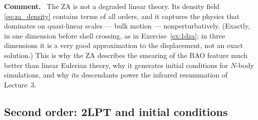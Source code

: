 \documentclass[a4paper,11pt]{article}
\numberwithin{equation}{section}
\newenvironment{remark}
  {\par\medskip\noindent\begingroup\small\color{ForestGreen!60!black}\textbf{Comment.}\ }
  {\endgroup\par\medskip}
\begin{document}
\begin{remark}
The ZA is not a degraded linear theory. Its density field \eqref{eq:za_density} contains terms of all orders, and it captures the physics that dominates on quasi-linear scales --- bulk motion --- nonperturbatively. (Exactly, in one dimension before shell crossing, as in Exercise~\ref{ex:1dza}; in three dimensions it is a very good approximation to the displacement, not an exact solution.) This is why the ZA describes the smearing of the BAO feature much better than linear Eulerian theory, why it generates initial conditions for $N$-body simulations, and why its descendants power the infrared resummation of Lecture~3.
\end{remark}

\subsection{Second order: 2LPT and initial conditions}
\label{sec:2lpt}
\end{document}

